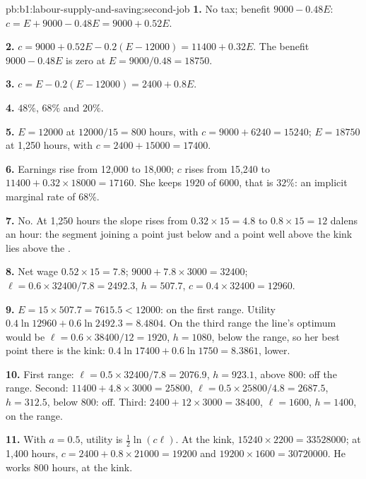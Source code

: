 \begin{solution}{pb:b1:labour-supply-and-saving:second-job}
\textbf{1.} No tax; benefit $9000 - 0.48E$: $c = E + 9000 - 0.48E = 9000 + 0.52E$.

\textbf{2.} $c = 9000 + 0.52E - 0.2(E - 12000) = 11400 + 0.32E$. The benefit
$9000 - 0.48E$ is zero at $E = 9000/0.48 = 18750$.

\textbf{3.} $c = E - 0.2(E - 12000) = 2400 + 0.8E$.

\textbf{4.} $48\%$, $68\%$ and $20\%$.

\textbf{5.} $E = 12000$ at $12000/15 = 800$ hours, with $c = 9000 + 6240 = 15240$;
$E = 18750$ at 1,250 hours, with $c = 2400 + 15000 = 17400$.

\textbf{6.} Earnings rise from 12,000 to 18,000; $c$ rises from 15,240 to
$11400 + 0.32 \times 18000 = 17160$. She keeps $1920$ of $6000$, that is $32\%$: an
implicit marginal rate of $68\%$.

\textbf{7.} No. At 1,250 hours the slope rises from $0.32 \times 15 = 4.8$ to
$0.8 \times 15 = 12$ dalens an hour: the segment joining a point just below and a
point well above the kink lies above the .

\textbf{8.} Net wage $0.52 \times 15 = 7.8$;  $9000 + 7.8 \times 3000 = 32400$;
$\ell = 0.6 \times 32400/7.8 = 2492.3$, $h = 507.7$, $c = 0.4 \times 32400 = 12960$.

\textbf{9.} $E = 15 \times 507.7 = 7615.5 < 12000$: on the first range. Utility
$0.4\ln 12960 + 0.6\ln 2492.3 = 8.4804$. On the third range the line's optimum
would be $\ell = 0.6 \times 38400/12 = 1920$, $h = 1080$, below the range, so her best
point there is the kink: $0.4\ln 17400 + 0.6\ln 1750 = 8.3861$, lower.

\textbf{10.} First range: $\ell = 0.5 \times 32400/7.8 = 2076.9$, $h = 923.1$, above 800:
off the range. Second:  $11400 + 4.8 \times 3000 = 25800$,
$\ell = 0.5 \times 25800/4.8 = 2687.5$, $h = 312.5$, below 800: off. Third: 
$2400 + 12 \times 3000 = 38400$, $\ell = 1600$, $h = 1400$, on the range.

\textbf{11.} With $a = 0.5$, utility is $\tfrac12\ln(c\ell)$. At the kink,
$15240 \times 2200 = 33528000$; at 1,400 hours, $c = 2400 + 0.8 \times 21000 = 19200$ and
$19200 \times 1600 = 30720000$. He works 800 hours, at the kink.


\end{solution}
